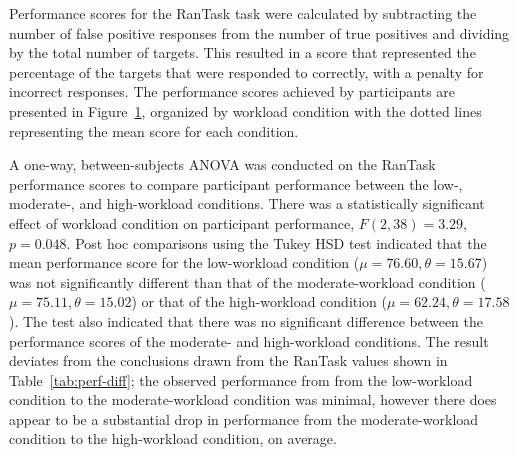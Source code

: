 \documentclass[11pt]{article}
\begin{document}
		\begin{table}[]
		\caption[Performance Difference Between Conditions]{Mean Performance Difference Between Conditions}
		\centering
		\label{tab:perf-diff}
		\end{table}
		
		Performance scores for the RanTask task were calculated by subtracting the number of false positive responses from the number of true positives and dividing by the total number of targets. This resulted in a score that represented the percentage of the targets that were responded to correctly, with a penalty for incorrect responses. The performance scores achieved by participants are presented in Figure~\ref{fig:rantask-perf}, organized by workload condition with the dotted lines representing the mean score for each condition.
		
		\begin{figure}
		\centering
		\caption{}
		\label{fig:rantask-perf}
		\end{figure} 
		
		A one-way, between-subjects ANOVA was conducted on the RanTask performance scores to compare participant performance between the low-, moderate-, and high-workload conditions. There was a statistically significant effect of workload condition on participant performance, \(F(2, 38) = 3.29\), \(p=0.048\). Post hoc comparisons using the Tukey HSD test indicated that the mean performance score for the low-workload condition (\(\mu = 76.60, \theta = 15.67 \)) was not significantly different than that of the moderate-workload condition (\(\mu = 75.11, \theta = 15.02\)) or that of the high-workload condition (\(\mu = 62.24, \theta = 17.58\)). The test also indicated that there was no significant difference between the performance scores of the moderate- and high-workload conditions. The result deviates from the conclusions drawn from the RanTask values shown in Table~\ref{tab:perf-diff}; the observed performance from from the low-workload condition to the moderate-workload condition was minimal, however there does appear to be a substantial drop in performance from the moderate-workload condition to the high-workload condition, on average.
		
\end{document}
